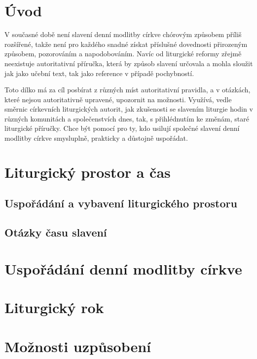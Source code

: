 \documentclass[a5paper, twoside]{article}
\newcommand{\titulniStranka}{
  \pagestyle{empty} %
  \begin{titlepage}
    \begin{center}
      
      \vspace*{5cm}
      
      {\Large\textbf{\nazev}}
          
      \vspace{1cm}
      
      \autor
      
      \vfill
      In adiutorium
      
      \onlyyeardate \today
    \end{center}
  \end{titlepage}
}
\newcommand{\autor}{Jakub Pavlík}
\newcommand{\nazev}{
  {\Huge Manuál}
  \vspace{1cm}

  ke společnému slavení\\
  denní modlitby církve
}
\begin{document}
\titulniStranka
\prazdnaStranka

\section*{Úvod}

V současné době není slavení denní modlitby církve chórovým způsobem
příliš rozšířené, takže není pro každého snadné získat příslušné
dovednosti přirozeným způsobem, pozorováním a napodobováním.
Navíc od liturgické reformy zřejmě neexistuje autoritativní příručka,
která by způsob slavení určovala a mohla sloužit jak jako učební text,
tak jako reference v případě pochybností.

Toto dílko má za cíl posbírat z různých míst autoritativní pravidla,
a v otázkách, které nejsou autoritativně upravené, upozornit na možnosti.
Využívá, vedle směrnic církevních liturgických autorit, jak zkušenosti 
se slavením liturgie hodin v různých komunitách
a společenstvích dnes, tak, s přihlédnutím ke změnám, staré liturgické
příručky.
Chce být pomocí pro ty, kdo usilují společné slavení denní modlitby církve
smysluplně, prakticky a důstojně uspořádat.

\section{Liturgický prostor a čas}
\subsection{Uspořádání a vybavení liturgického prostoru}
\subsection{Otázky času slavení}





\section{Uspořádání denní modlitby církve}

\section{Liturgický rok}

\section{Možnosti uzpůsobení}
\end{document}
